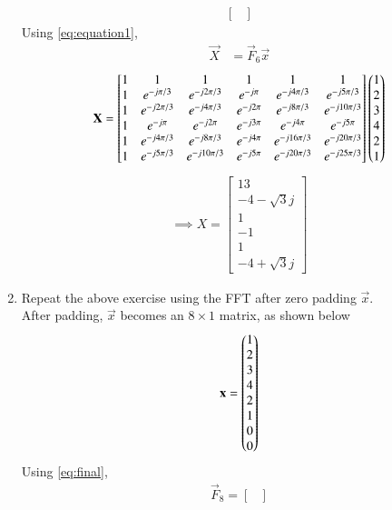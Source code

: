 \documentclass[journal,12pt,twocolumn]{IEEEtran}
\renewcommand\thesection{\arabic{section}}
\begin{document}
\begin{enumerate}[label=\arabic*.,ref=\thesection.\theenumi]
\begin{align}
\begin{bmatrix}
		\end{bmatrix}
	\end{align}
	Using \eqref{eq:equation1},
	\begin{align}
		\vec{X}&=\vec{F}_6\vec{x}
	\end{align}
	\begin{align}
		\mathbf{X}=\begin{bmatrix}
			1&1&1&1&1&1\\1&e^{-j \pi/3 }&e^{-j 2 \pi/3 }&e^{-j \pi }&e^{-j 4 \pi/3 }&e^{-j 5 \pi/3 }\\1&e^{-j 2 \pi/3 }&e^{-j 4 \pi/3 }&e^{-j 2 \pi }&e^{-j 8\pi/3 }&e^{-j 10 \pi/3 }\\1&e^{-j \pi }&e^{-j 2 \pi }&e^{-j 3 \pi }&e^{-j 4 \pi }&e^{-j 5 \pi }\\1&e^{-j 4 \pi/3 }&e^{-j 8 \pi/3 }&e^{-j 4 \pi }&e^{-j 16 \pi/3 }&e^{-j 20 \pi/3 }\\1&e^{-j 5 \pi/3 }&e^{-j 10 \pi/3 }&e^{-j 5 \pi }&e^{-j 20 \pi/3 }&e^{-j 25 \pi/3 }
		\end{bmatrix} \begin{pmatrix}1\\2\\3\\4\\2\\1\end{pmatrix}
	\end{align}
	\begin{align}
		\implies X=\begin{bmatrix}
			13\\-4-\sqrt{3}j\\1\\-1\\1\\-4+\sqrt{3}j
		\end{bmatrix}
	\end{align}
	\item Repeat the above exercise using the FFT
	after zero padding $\vec{x}$.\\
	\solution After padding, $\vec{x}$ becomes an $8 \times 1$ matrix, as shown below
	\begin{align}
		\mathbf{x}=\begin{pmatrix}1\\2\\3\\4\\2\\1\\0\\0\end{pmatrix}
	\end{align}
	Using \eqref{eq:final},
	\begin{align}
		\vec{F}_{8}=
		\begin{bmatrix}

\end{bmatrix}
\end{align}
\end{enumerate}
\end{document}
